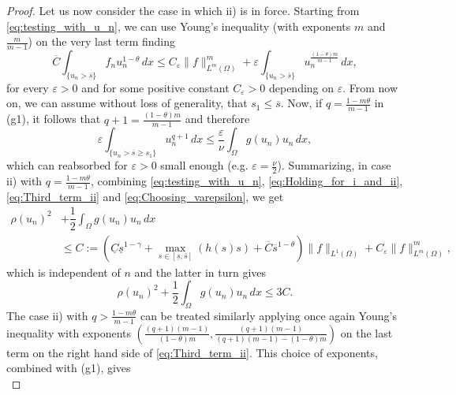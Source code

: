 \documentclass[11pt,a4paper]{amsart}
\theoremstyle{definition}
\theoremstyle{plain}
\numberwithin{equation}{section}
\begin{document}
{\begin{proof}
  Let us now consider the case in which {\rm ii)} is in force. Starting from \eqref{eq:testing_with_u_n}, we can use Young's inequality (with exponents $m$ and $\tfrac{m}{m-1}$) on the very last term finding
  \begin{equation}\label{eq:Third_term_ii}
\overline{C}\int_{\{u_n>\overline{s}\}}f_n u_n^{1-\theta}\,dx
  \leq C_{\varepsilon} \|f\|^{m}_{L^{m}(\Omega)} + \varepsilon \int_{\{u_n > \overline{s}\}}u_{n}^{\tfrac{(1-\theta)m}{m-1}}\,dx,
  \end{equation}
  \noindent for every $\varepsilon>0$ and for some positive constant $C_\varepsilon>0$ depending on $\varepsilon$. From now on, we can assume without loss of generality, that $s_1 \leq \overline{s}$.
  Now, if $q= \tfrac{1-m\theta}{m-1}$ in {\rm (g1)}, it follows that
  $q+1 =\tfrac{(1-\theta)m}{m-1}$ and therefore
  \begin{equation}\label{eq:Choosing_varepsilon}
  \varepsilon \int_{\{ u_n>\overline{s}\geq s_1\}}u_n^{q+1}\,dx \leq \dfrac{\varepsilon}{\nu}\int_{\Omega}g(u_n)u_n\,dx,
  \end{equation}
  \noindent which can reabsorbed for $\varepsilon>0$ small enough (e.g. $\varepsilon = \tfrac{\nu}{2}$). Summarizing, in case {\rm ii)} with $q= \tfrac{1-m\theta}{m-1}$, combining \eqref{eq:testing_with_u_n}, \eqref{eq:Holding_for_i_and_ii}, \eqref{eq:Third_term_ii} and \eqref{eq:Choosing_varepsilon}, we get
  \begin{equation*}
  \begin{aligned}
    \rho(u_n)^2 &+ \dfrac{1}{2}\int_{\Omega}g(u_n)u_n\,dx \\
   & \leq C:=\left( \underline{C}\underline{s}^{1-\gamma} + \max_{s \in [\underline{s},\overline{s}]}(h(s)s) + \overline{C}\overline{s}^{1-\theta}\right)\|f\|_{L^{1}(\Omega)} + C_{\varepsilon} \|f\|^{m}_{L^{m}(\Omega)},
   \end{aligned}
  \end{equation*}
  \noindent which is independent of $n$ and the latter in turn gives
  \begin{equation*}
  \rho(u_n)^2 + \dfrac{1}{2}\int_{\Omega}g(u_n)u_n\,dx \leq 3C.
  \end{equation*}
  The case {\rm ii)} with $q >\tfrac{1-m\theta}{m-1}$ can be treated similarly applying once again Young's inequality with exponents $\left(\tfrac{(q+1)(m-1)}{(1-\theta)m}, \tfrac{(q+1)(m-1)}{(q+1)(m-1)-(1-\theta)m}\right)$ on the last term on the right hand side of \eqref{eq:Third_term_ii}. This choice of exponents, combined with {\rm (g1)}, gives
  \begin{equation}

\end{equation}
\end{proof}}
\end{document}

